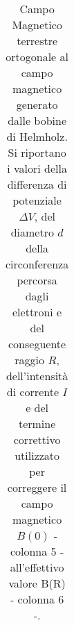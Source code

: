 \documentclass[]{article}
\begin{document}
\begin{table}
\begin{tabular}{||c|c|c|c|c|c|c||}
    \end{tabular}
    \caption{Campo Magnetico terrestre ortogonale al campo magnetico generato dalle bobine di Helmholz. Si riportano i valori della differenza di potenziale $\Delta V$, del diametro $ d $ della circonferenza percorsa dagli elettroni e del conseguente raggio $ R $, dell'intensità di corrente $ I $ e del termine correttivo utilizzato per correggere il campo magnetico $B(0)$ - colonna 5 - all'effettivo valore B(R) - colonna 6 -.}
    \label{CM_ortogonale}
\end{table}
\end{document}
